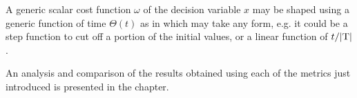 A generic scalar cost function $\omega$ of the decision variable $x$
may be shaped using a generic function of time $\Theta(t)$ as in
which may take any form, e.g. it could be a step function to cut off a portion of the initial values, or a linear function of ${t}/{|\mathrm{T}|}$.

An analysis and comparison of the results obtained using each of the metrics just introduced is presented in the  chapter.